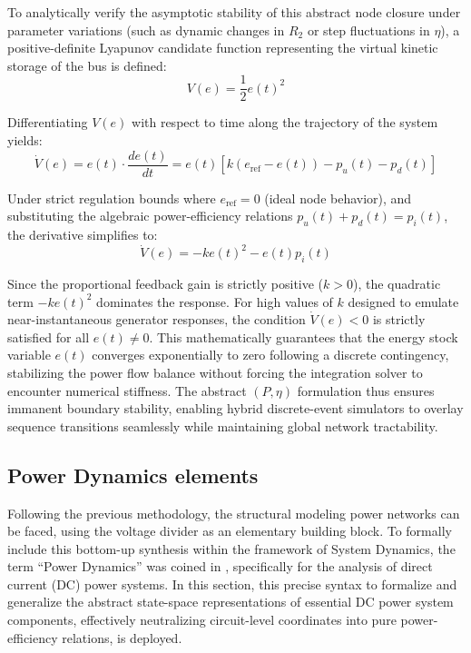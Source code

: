 \documentclass[11pt, a4paper]{article}
\begin{document}
To analytically verify the asymptotic stability of this abstract node closure under parameter variations (such as dynamic changes in $R_2$ or step fluctuations in $\eta$), a positive-definite Lyapunov candidate function representing the virtual kinetic storage of the bus is defined:
\begin{equation}
    V(e) = \frac{1}{2} e(t)^2
\end{equation}

Differentiating $V(e)$ with respect to time along the trajectory of the system yields:
\begin{equation}
    \dot{V}(e) = e(t) \cdot \frac{de(t)}{dt} = e(t) \left[ k(e_{\text{ref}} - e(t)) - p_u(t) - p_d(t) \right]
\end{equation}

Under strict regulation bounds where $e_{\text{ref}} = 0$ (ideal node behavior), and substituting the algebraic power-efficiency relations $p_u(t) + p_d(t) = p_i(t)$, the derivative simplifies to:
\begin{equation}
    \dot{V}(e) = -k e(t)^2 - e(t) p_i(t)
\end{equation}

Since the proportional feedback gain is strictly positive ($k > 0$), the quadratic term $-k e(t)^2$ dominates the response. For high values of $k$ designed to emulate near-instantaneous generator responses, the condition $\dot{V}(e) < 0$ is strictly satisfied for all $e(t) \neq 0$. This mathematically guarantees that the energy stock variable $e(t)$ converges exponentially to zero following a discrete contingency, stabilizing the power flow balance without forcing the integration solver to encounter numerical stiffness. The abstract $(P, \eta)$ formulation thus ensures immanent boundary stability, enabling hybrid discrete-event simulators to overlay sequence transitions seamlessly while maintaining global network tractability.


\subsection{Power Dynamics elements}
Following the previous methodology, the structural modeling power networks can be faced, using the voltage divider as an elementary building block. To formally include this bottom-up synthesis within the framework of System Dynamics, the term ``Power Dynamics'' was coined in \cite{gonzalezdedurana2025novel}, specifically for the analysis of direct current (DC) power systems. In this section, this precise syntax to formalize and generalize the abstract state-space representations of essential DC power system components, effectively neutralizing circuit-level coordinates into pure power-efficiency relations, is deployed.
\end{document}
